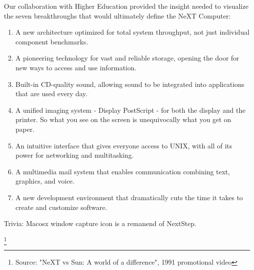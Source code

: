  Our collaboration with Higher Education provided the insight needed to visualize the seven breakthroughs that would ultimately define the NeXT Computer:\\
\begin{enumerate}
\item A new architecture optimized for total system throughput, not just individual component benchmarks.

\item A pioneering technology for vast and reliable storage, opening the door for new ways to access and use information.

\item Built-in CD-quality sound, allowing sound to be integrated into applications that are used every day.

\item A unified imaging system - Display PostScript - for both the display and the printer. So what you see on the screen is unequivocally what you get on paper.

\item An intuitive interface that gives everyone access to UNIX, with all of its power for networking and multitasking.

\item A multimedia mail system that enables communication combining text, graphics, and voice.

\item A new development environment that dramatically cuts the time it takes to create and customize software.
\end{enumerate}

\par
Trivia: Macosx window capture icon is a remanend of NextStep.\\
\par
\footnote{Source: "NeXT vs Sun: A world of a difference", 1991 promotional video}

















